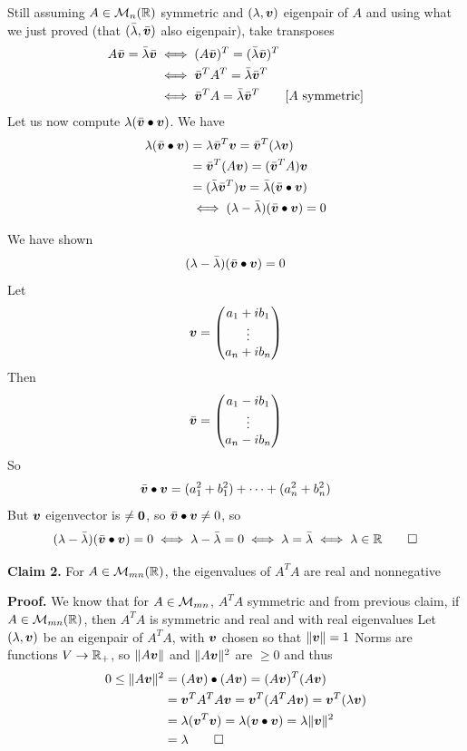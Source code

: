 \documentclass[aspectratio=169]{beamer}\usepackage[]{graphicx}\usepackage[]{xcolor}
\begin{document}
\begin{frame}
Still assuming $A\in\mathcal{M}_n(\mathbb{R})$ symmetric and $(\lambda,\bm{v})$ eigenpair of $A$ and using what we just proved (that $(\bar\lambda,\bar{\bm{v}})$ also eigenpair), take transposes
\begin{align*}
A\bar{\bm{v}} = \bar\lambda\bar{\bm{v}} &\iff (A\bar{\bm{v}})^T = (\bar\lambda\bar{\bm{v}})^T \\
&\iff \bar{\bm{v}}^TA^T=\bar\lambda\bar{\bm{v}}^T \\
&\iff \bar{\bm{v}}^T A = \bar\lambda\bar{\bm{v}}^T \qquad{\textrm{[$A$ symmetric]}}
\end{align*}
\vfill
Let us now compute $\lambda (\bar{\bm{v}}\bullet\bm{v})$. We have
\begin{align*}
\lambda (\bar{\bm{v}}\bullet\bm{v}) &= \lambda\bar{\bm{v}}^T\bm{v} = \bar{\bm{v}}^T(\lambda\bm{v}) \\
&= \bar{\bm{v}}^T(A\bm{v}) = (\bar{\bm{v}}^TA)\bm{v} \\
&= (\bar\lambda\bar{\bm{v}}^T)\bm{v} = \bar\lambda(\bar{\bm{v}}\bullet\bm{v}) \\
&\iff (\lambda-\bar\lambda)(\bar{\bm{v}}\bullet\bm{v}) = 0
\end{align*}
\end{frame}

\begin{frame}
We have shown
\[
(\lambda-\bar\lambda)(\bar{\bm{v}}\bullet\bm{v}) = 0
\]
Let 
\[
\bm{v} = \begin{pmatrix}
a_1+ib_1 \\
\vdots \\
a_n+ib_n
\end{pmatrix}
\]
Then
\[
\bar{\bm{v}} = \begin{pmatrix}
a_1-ib_1 \\
\vdots \\
a_n-ib_n
\end{pmatrix}
\]
So
\[
\bar{\bm{v}}\bullet\bm{v} = (a_1^2+b_1^2)+\cdots+(a_n^2+b_n^2)
\]
But $\bm{v}$ eigenvector is $\neq\b0$, so $\bar{\bm{v}}\bullet\bm{v}\neq 0$, so
\[
(\lambda-\bar\lambda)(\bar{\bm{v}}\bullet\bm{v}) = 0
\iff \lambda-\bar\lambda=0
\iff \lambda=\bar\lambda\iff \lambda\in\mathbb{R}\qed
\]
\end{frame}


\begin{frame}
\textbf{Claim 2.} For $A\in\mathcal{M}_{mn}(\mathbb{R})$, the eigenvalues of $A^TA$ are real and nonnegative

\vfill
\textbf{Proof.}
We know that for $A\in\mathcal{M}_{mn}$, $A^TA$ symmetric and from previous claim, if $A\in\mathcal{M}_{mn}(\mathbb{R})$, then $A^TA$ is symmetric and real and with real eigenvalues
\vfill
Let $(\lambda,\bm{v})$ be an eigenpair of $A^TA$, with $\bm{v}$ chosen so that $\|\bm{v}\|=1$
\vfill 
Norms are functions $V\to\mathbb{R}_+$, so $\|A\bm{v}\|$ and $\|A\bm{v}\|^2$ are $\geq 0$ and thus
\begin{align*}
0\leq \|A\bv\|^2 &= (A\bv)\bullet(A\bv) = (A\bv)^T(A\bv) \\
&= \bv^TA^TA\bv = \bv^T(A^TA\bv) = \bv^T(\lambda\bv) \\
&= \lambda(\bv^T\bv) = \lambda(\bv\bullet\bv) = \lambda\|\bv\|^2 \\
&= \lambda\hfill\qed
\end{align*}
\end{frame}
\end{document}
